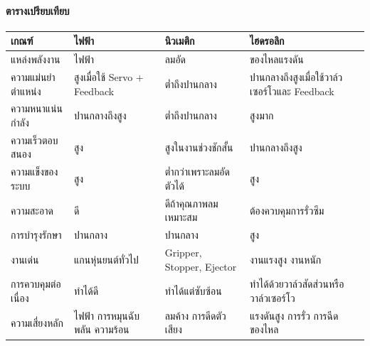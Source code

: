\newpage

\paragraph{ตารางเปรียบเทียบ}

\begin{table}[htbp]
    \centering
    \begin{tabular}{l l l l}
        \hline
        \textbf{เกณฑ์} & \textbf{ไฟฟ้า} & \textbf{นิวเมติก} & \textbf{ไฮดรอลิก} \\
        \hline
        แหล่งพลังงาน & ไฟฟ้า & ลมอัด & ของไหลแรงดัน \\
        ความแม่นยำตำแหน่ง & สูงเมื่อใช้ Servo + Feedback & ต่ำถึงปานกลาง & ปานกลางถึงสูงเมื่อใช้วาล์วเซอร์โวและ Feedback \\
        ความหนาแน่นกำลัง & ปานกลางถึงสูง & ต่ำถึงปานกลาง & สูงมาก \\
        ความเร็วตอบสนอง & สูง & สูงในงานช่วงชักสั้น & ปานกลางถึงสูง \\
        ความแข็งของระบบ & สูง & ต่ำกว่าเพราะลมอัดตัวได้ & สูง \\
        ความสะอาด & ดี & ดีถ้าคุณภาพลมเหมาะสม & ต้องควบคุมการรั่วซึม \\
        การบำรุงรักษา & ปานกลาง & ปานกลาง & สูง \\
        งานเด่น & แกนหุ่นยนต์ทั่วไป & Gripper, Stopper, Ejector & งานแรงสูง งานหนัก \\
        การควบคุมต่อเนื่อง & ทำได้ดี & ทำได้แต่ซับซ้อน & ทำได้ด้วยวาล์วสัดส่วนหรือวาล์วเซอร์โว \\
        ความเสี่ยงหลัก & ไฟฟ้า การหมุนฉับพลัน ความร้อน & ลมค้าง การดีดตัว เสียง & แรงดันสูง การรั่ว การฉีดของไหล \\
        \hline
    \end{tabular}
\end{table}


